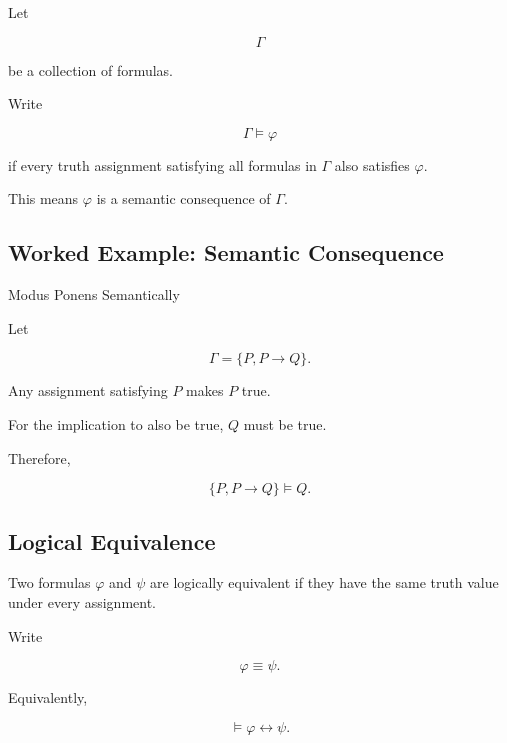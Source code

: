 Let

\[
\Gamma
\]

be a collection of formulas.

Write

\[
\boxed{
\Gamma\models\varphi
}
\]

if every truth assignment satisfying all formulas in \(\Gamma\) also
satisfies \(\varphi\).

This means \(\varphi\) is a semantic consequence of \(\Gamma\).

\subsection{Worked Example: Semantic Consequence}
\label{subsec:worked-semantic-consequence}

\begin{workedexamplebox}{Modus Ponens Semantically}

Let

\[
\Gamma
=
\{
P,
P\rightarrow Q
\}.
\]

Any assignment satisfying \(P\) makes \(P\) true.

For the implication to also be true, \(Q\) must be true.

Therefore,

\begin{answerbox}
\[
\boxed{
\{
P,
P\rightarrow Q
\}
\models
Q.
}
\]
\end{answerbox}

\end{workedexamplebox}

\subsection{Logical Equivalence}
\label{subsec:formal-logical-equivalence}

Two formulas \(\varphi\) and \(\psi\) are logically equivalent if they
have the same truth value under every assignment.

Write

\[
\boxed{
\varphi
\equiv
\psi.
}
\]

Equivalently,

\[
\boxed{
\models
\varphi\leftrightarrow\psi.
}
\]


